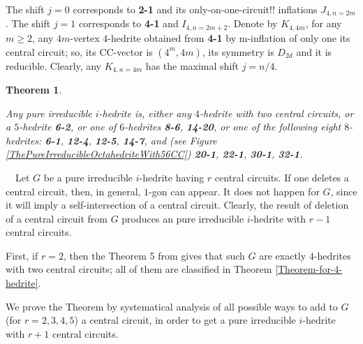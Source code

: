 \documentclass[12pt]{article}
\newtheorem{theorem}{Theorem}
\newcommand{\proof}{\noindent{\bf Proof.}\ \ }
\begin{document}
The shift $j=0$ corresponds to {\bf 2-1} and its 
only-on-one-circuit!!
inflations $J_{4,n=2m}$. The shift $j=1$ corresponds to {\bf 4-1} and 
$I_{4,n=2m+2}$.
Denote by $K_{4,4m}$, for any $m \ge 2$, any $4m$-vertex $4$-hedrite obtained
from {\bf 4-1} by m-inflation of only one its central circuit; so, its 
CC-vector is $(4^m,4m)$, its symmetry is $D_{2d}$ and it is reducible.
Clearly, any $K_{4,n=4m}$ has the maximal shift $j=n/4$.




%










\begin{theorem}\label{TheOneWithSimpleCentralCircuit}

Any pure irreducible $i$-hedrite is, either any $4$-hedrite with two
central circuits, or a $5$-hedrite {\bf 6-2}, or one of $6$-hedrites
{\bf 8-6}, {\bf 14-20}, or one of the following eight $8$-hedrites:
{\bf 6-1}, {\bf 12-4}, {\bf 12-5}, {\bf 14-7}, and (see Figure 
\ref{ThePureIrreducibleOctahedriteWith56CC}) {\bf 20-1}, {\bf 22-1},
{\bf 30-1}, {\bf 32-1}.


\end{theorem}


\proof Let $G$ be a pure irreducible $i$-hedrite having $r$ central circuits. 
If one deletes a central circuit, then, in general, $1$-gon can appear. It 
does not happen for $G$, since it will imply a self-intersection of a central 
circuit. Clearly, the result of deletion of a central circuit from $G$ 
produces an pure irreducible $i$-hedrite with $r-1$ central circuits.

First, if $r=2$, then the Theorem 5 from \cite{DSt} gives that such $G$ are 
exactly $4$-hedrites with two central circuits; all of them are classified 
in Theorem \ref{Theorem-for-4-hedrite}.

We prove the Theorem by systematical analysis of all possible ways to add 
to $G$ (for $r=2,3,4,5$) a central circuit, in order to get a pure 
irreducible $i$-hedrite with $r+1$ central circuits. 
\end{document}
